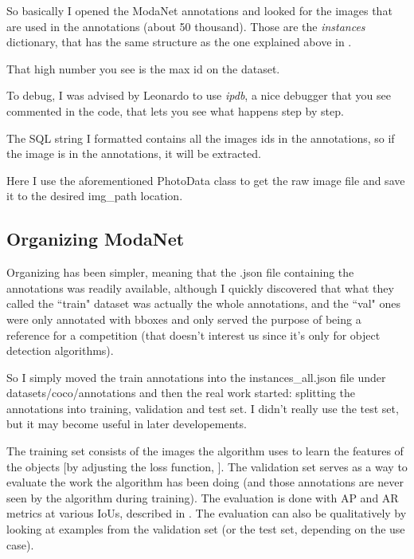 

So basically I opened the ModaNet annotations and looked for the images that are used in the annotations (about 50 thousand). Those are the \emph{instances} dictionary, that has the same structure as the one explained above in .

That high number you see is the max id on the dataset. 

To debug, I was advised by Leonardo to use \emph{ipdb}, a nice debugger that you see commented in the code, that lets you see what happens step by step.

The SQL string I formatted contains all the images ids in the annotations, so if the image is in the annotations, it will be extracted.



Here I use the aforementioned PhotoData class to get the raw image file and save it to the desired img\_path location.

\subsection{Organizing ModaNet}\label{s:ds-org-mn}

Organizing \modanet has been simpler, meaning that the .json file containing the annotations was readily available, although I quickly discovered that what they called the “train" dataset was actually the whole annotations, and the “val" ones were only annotated with bboxes and only served the purpose of being a reference for a competition (that doesn't interest us since it's only for object detection algorithms).

So I simply moved the train annotations into the instances\_all.json file under datasets/coco/annotations and then the real work started: splitting the annotations into training, validation and test set. I didn't really use the test set, but it may become useful in later developements.

The training set consists of the images the algorithm uses to learn the features of the objects [by adjusting the loss function, ]. 
The validation set serves as a way to evaluate the work the algorithm has been doing (and those annotations are never seen by the algorithm during training). The evaluation is done with AP and AR metrics at various IoUs, described in . The evaluation can also be qualitatively by looking at examples from the validation set (or the test set, depending on the use case).

